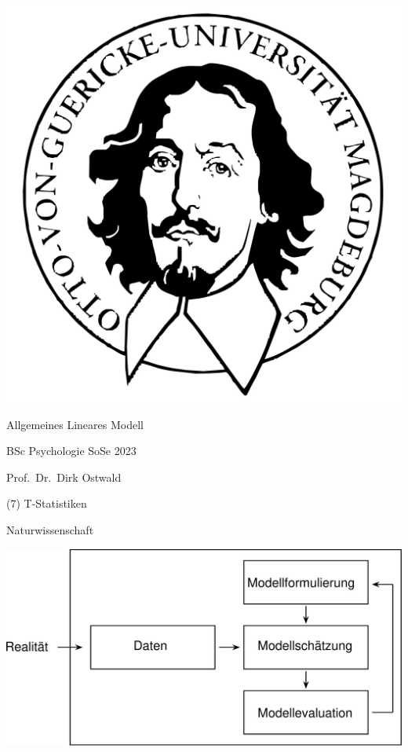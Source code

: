 \documentclass[
  8pt,
  ignorenonframetext,
]{beamer}
\author{}
\date{\vspace{-2.5em}}
\begin{document}
\begin{frame}[plain]{}
\protect\hypertarget{section}{}
\center

\begin{center}\includegraphics[width=0.2\linewidth]{7_Abbildungen/alm_7_otto} \end{center}

\vspace{2mm}

\huge

Allgemeines Lineares Modell \vspace{6mm}

\large

BSc Psychologie SoSe 2023

\vspace{6mm}
\normalsize

Prof.~Dr.~Dirk Ostwald
\end{frame}

\begin{frame}[plain]{}
\protect\hypertarget{section-1}{}
\center
\huge
\vfill

\noindent (7) T-Statistiken \vfill
\end{frame}

\begin{frame}{}
\protect\hypertarget{section-2}{}
\large

Naturwissenschaft \vspace{7mm}

\begin{center}\includegraphics[width=0.9\linewidth]{7_Abbildungen/alm_7_wissenschaft} \end{center}
\end{frame}
\end{document}
